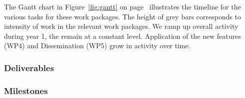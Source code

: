 \ifgrantagreement\else
\wpfigstyle{\def\tabcolsep{3.5pt}}
{\wpfig}
\fi


The Gantt chart in Figure~\ref{fig:gantt} on page~\pageref{fig:gantt}
illustrates the timeline for the various tasks for these work packages. The
height of grey bars corresponds to intensity of work in the relevant work
packages. We ramp up overall activity during year 1, the remain at a constant
level. Application of the new features (WP4) and Dissemination (WP5) grow in
activity over time.
\ganttchart[draft,xscale=.4,milestones,yscale=0.9,step=3]


\ifgrantagreement\else
\newpage
\subsubsection{Deliverables}\label{sec:deliverables}
\fi

\subsubsection{Milestones}\label{sec:milestones}









